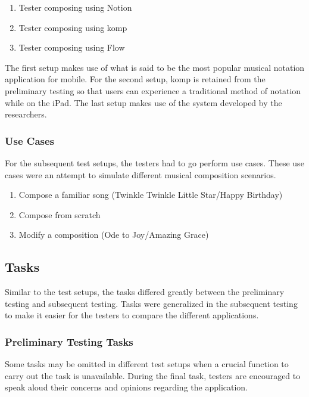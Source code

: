 \begin{enumerate}
\item Tester composing using Notion
\item Tester composing using komp
\item Tester composing using Flow
\end{enumerate}

The first setup makes use of what is said to be the most popular musical notation application for mobile. For the second setup, komp is retained from the preliminary testing so that users can experience a traditional method of notation while on the iPad. The last setup makes use of the system developed by the researchers.

\subsubsection{Use Cases}
\label{sec:use-cases}

For the subsequent test setups, the testers had to go perform use cases. These use cases were an attempt to simulate different musical composition scenarios. 

\begin{enumerate}
    \item Compose a familiar song (Twinkle Twinkle Little Star/Happy Birthday)
    \item Compose from scratch
    \item Modify a composition (Ode to Joy/Amazing Grace)
\end{enumerate}


\subsection{Tasks}
\label{sec:tasks}

Similar to the test setups, the tasks differed greatly between the preliminary testing and subsequent testing. Tasks were generalized in the subsequent testing to make it easier for the testers to compare the different applications.

\subsubsection{Preliminary Testing Tasks}
\label{sec:preliminary-tasks}

Some tasks may be omitted in different test setups when a crucial function to carry out the task is unavailable. During the final task, testers are encouraged to speak aloud their concerns and opinions regarding the application.

